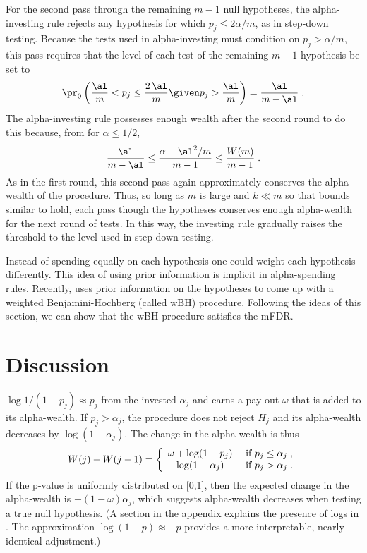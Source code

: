 \documentclass[12pt]{article}
\begin{document}
For the second pass through the remaining $m-1$ null hypotheses, the
 alpha-investing rule rejects any hypothesis for which $p_j \le
 2\alpha/m$, as in step-down testing.  Because the tests used in alpha-investing must condition on $p_j > \alpha/m$, this pass requires that the level of each test of the remaining $m-1$ hypothesis be set to
\begin{displaymath}
  \pr_0\left(
   \frac{\al}{m} < p_j \le \frac{2\,\al}{m} \given p_j > \frac{\al}{m}
    \right)
   = \frac{\al}{m-\al} \;.
\end{displaymath}
The alpha-investing rule possesses enough wealth after the second round to do this because,
from  for $\alpha \le 1/2$,
\begin{displaymath}
    \frac{\al}{m-\al} \le \frac{\alpha - \al^2/m}{m-1} 
     \le \frac{W(m)}{m-1} \;.
\end{displaymath}
As in the first round, this second pass again approximately conserves
the alpha-wealth of the procedure.  Thus, so long as $m$ is large and
$k \ll m$ so that bounds similar to  hold, each
pass though the hypotheses conserves enough alpha-wealth for the next
round of tests.  In this way, the investing rule gradually raises the
threshold to the level used in step-down testing.

Instead of spending equally on each hypothesis one could weight
 each hypothesis differently.  This idea of using prior information is
 implicit in alpha-spending rules.  Recently, \cite{wasserman04} uses
 prior information on the hypotheses to come up with a weighted
 Benjamini-Hochberg (called wBH) procedure.  Following the ideas of
 this section, we can show that the wBH procedure satisfies the mFDR.

\section{Discussion}           \label{sec:discussion}

$\log 1/(1-p_j) \approx
p_j$ from the invested $\alpha_j$ and earns a pay-out $\omega$ that is
added to its alpha-wealth.  If $p_j > \alpha_j$, the procedure does not
reject $H_j$ and its alpha-wealth decreases by $\log(1-\alpha_j)$.
The change in the alpha-wealth is thus
\begin{equation}
  W(j) - W(j-1) =
   \left\{ \begin{array}{cc}
                \omega + \log (1-p_j) & \mbox{ if } p_j \le \alpha_j  \;,\cr
                \log(1 - \alpha_j)       & \mbox{ if } p_j > \alpha_j   \;.
           \end{array} \right.
\label{eq:Wm}
\end{equation}
If the p-value is uniformly distributed on [0,1], then the expected
 change in the alpha-wealth is $-(1 - \omega) \alpha_j$, which suggests
 alpha-wealth decreases when testing a true null hypothesis. (A section in the appendix explains the presence of logs in . The approximation $\log(1-p) \approx -p$ provides a more interpretable, nearly identical adjustment.)
\end{document}
